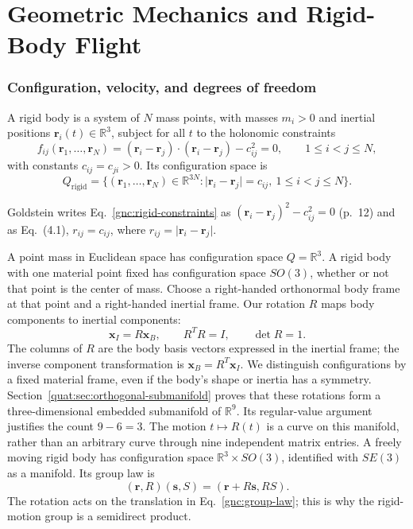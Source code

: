 \part{Geometric Mechanics and Rigid-Body Flight}
\section{Configuration, velocity, and degrees of freedom}
\begin{definition}\label{gnc:def:rigid-body}
A rigid body is a system of $N$ mass points, with masses $m_i>0$ and
inertial positions $\mathbf r_i(t)\in\mathbb R^3$, subject for all $t$ to
the holonomic constraints
\begin{equation}\label{gnc:rigid-constraints}
 f_{ij}(\mathbf r_1,\dots,\mathbf r_N)
 =(\mathbf r_i-\mathbf r_j)\cdot(\mathbf r_i-\mathbf r_j)-c_{ij}^2=0,
 \qquad 1\le i<j\le N,
\end{equation}
with constants $c_{ij}=c_{ji}>0$. Its configuration space is
\begin{equation}\label{gnc:rigid-level-set}
 Q_{\mathrm{rigid}}
 =\bigl\{(\mathbf r_1,\dots,\mathbf r_N)\in\mathbb R^{3N}:
   \lvert\mathbf r_i-\mathbf r_j\rvert=c_{ij},\ 1\le i<j\le N\bigr\}.
\end{equation}
\end{definition}
Goldstein writes Eq.~\eqref{gnc:rigid-constraints} as
$(\mathbf r_i-\mathbf r_j)^2-c_{ij}^2=0$ (p.~12) and as Eq.~(4.1),
$r_{ij}=c_{ij}$, where $r_{ij}=\lvert\mathbf r_i-\mathbf r_j\rvert$.

A point mass in Euclidean space has configuration space $Q=\mathbb R^3$.
A rigid body with one material point fixed has configuration space $SO(3)$,
whether or not that point is the center of mass. Choose a right-handed
orthonormal body frame at that point and a right-handed inertial frame.
Our rotation $R$ maps body components to inertial components:
\begin{equation}\label{gnc:configuration-map}
 \mathbf x_I=R\mathbf x_B,\qquad R^TR=I,\qquad \det R=1.
\end{equation}
The columns of $R$ are the body basis vectors expressed in the inertial
frame; the inverse component transformation is $\mathbf x_B=R^T\mathbf x_I$.
We distinguish configurations by a fixed material frame, even if the
body's shape or inertia has a symmetry.
Section~\ref{quat:sec:orthogonal-submanifold} proves that these rotations
form a three-dimensional embedded submanifold of $\mathbb R^9$.
Its regular-value argument justifies the count $9-6=3$.
The motion $t\mapsto R(t)$ is a curve on this manifold, rather than an
arbitrary curve through nine independent matrix entries.
A freely
moving rigid body has configuration space $\mathbb R^3\times SO(3)$,
identified with $SE(3)$ as a manifold. Its group law is
\begin{equation}\label{gnc:group-law}
 (\mathbf r,R)(\mathbf s,S)=(\mathbf r+R\mathbf s,RS).
\end{equation}
The rotation acts on the translation in Eq.~\eqref{gnc:group-law}; this is
why the rigid-motion group is a semidirect product.

